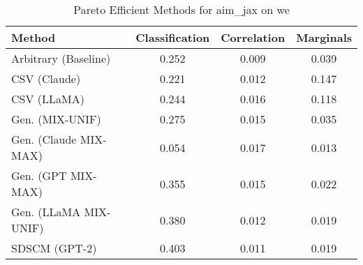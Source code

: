 \begin{table}[t!]
    \centering
    \caption{Pareto Efficient Methods for aim_jax on we}
    \label{tab:pareto_efficient_methods_aim_jax_we}
    \begin{tabular}{lccc}
    \toprule
    Method & Classification & Correlation & Marginals \\
    \midrule
    Arbitrary (Baseline) & 0.252 & \cellcolor{gold!30}0.009 & 0.039 \\
    CSV (Claude) & \cellcolor{silver!30}0.221 & \cellcolor{bronze!30}0.012 & 0.147 \\
    CSV (LLaMA) & \cellcolor{bronze!30}0.244 & 0.016 & 0.118 \\
    Gen. (MIX-UNIF) & 0.275 & 0.015 & 0.035 \\
    Gen. (Claude MIX-MAX) & \cellcolor{gold!30}0.054 & 0.017 & \cellcolor{gold!30}0.013 \\
    Gen. (GPT MIX-MAX) & 0.355 & 0.015 & 0.022 \\
    Gen. (LLaMA MIX-UNIF) & 0.380 & 0.012 & \cellcolor{bronze!30}0.019 \\
    SDSCM (GPT-2) & 0.403 & \cellcolor{silver!30}0.011 & \cellcolor{silver!30}0.019 \\
    \bottomrule
    \end{tabular}
\end{table}